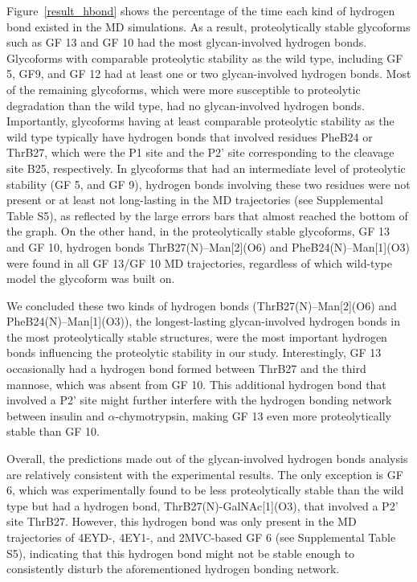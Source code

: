\documentclass[sn-vancouver]{sn-jnl}
\begin{document}
Figure~\ref{result_hbond} shows the percentage of the time each kind of hydrogen bond existed in the MD simulations. As a result, proteolytically stable glycoforms such as GF 13 and GF 10 had the most glycan-involved hydrogen bonds. Glycoforms with comparable proteolytic stability as the wild type, including GF 5, GF9, and GF 12 had at least one or two glycan-involved hydrogen bonds. Most of the remaining glycoforms, which were more susceptible to proteolytic degradation than the wild type, had no glycan-involved hydrogen bonds. Importantly, glycoforms having at least comparable proteolytic stability as the wild type typically have hydrogen bonds that involved residues PheB24 or ThrB27, which were the P1 site and the P2' site corresponding to the cleavage site B25, respectively. In glycoforms that had an intermediate level of proteolytic stability (GF 5, and GF 9), hydrogen bonds involving these two residues were not present or at least not long-lasting in the MD trajectories (see Supplemental Table S5), as reflected by the large errors bars that almost reached the bottom of the graph. On the other hand, in the proteolytically stable glycoforms, GF 13 and GF 10, hydrogen bonds ThrB27(N)--Man[2](O6) and PheB24(N)--Man[1](O3) were found in all GF 13/GF 10 MD trajectories, regardless of which wild-type model the glycoform was built on. 

We concluded these two kinds of hydrogen bonds (ThrB27(N)--Man[2](O6) and PheB24(N)--Man[1](O3)), the longest-lasting glycan-involved hydrogen bonds in the most proteolytically stable structures, were the most important hydrogen bonds influencing the proteolytic stability in our study. Interestingly, GF 13 occasionally had a hydrogen bond formed between ThrB27 and the third mannose, which was absent from GF 10. This additional hydrogen bond that involved a P2' site might further interfere with the hydrogen bonding network between insulin and $\alpha$-chymotrypsin, making GF 13 even more proteolytically stable than GF 10. 

Overall, the predictions made out of the glycan-involved hydrogen bonds analysis are relatively consistent with the experimental results. The only exception is GF 6, which was experimentally found to be less proteolytically stable than the wild type but had a hydrogen bond, ThrB27(N)-GalNAc[1](O3), that involved a P2' site ThrB27. However, this hydrogen bond was only present in the MD trajectories of 4EYD-, 4EY1-, and 2MVC-based GF 6 (see Supplemental Table S5), indicating that this hydrogen bond might not be stable enough to consistently disturb the aforementioned hydrogen bonding network. 
\end{document}
